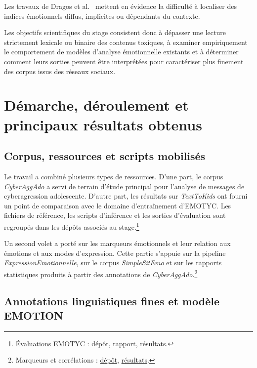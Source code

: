 Les travaux de Dragos et al.~\citep{dragos2022angry}  mettent en évidence la difficulté à localiser des indices émotionnels diffus, implicites ou dépendants du contexte.

Les objectifs scientifiques du stage consistent donc à dépasser une lecture strictement lexicale ou binaire des contenus toxiques, à examiner empiriquement le comportement de modèles d'analyse émotionnelle existants et à déterminer comment leurs sorties peuvent être interprétées pour caractériser plus finement des corpus issus des réseaux sociaux.


\section*{Démarche, déroulement et principaux résultats obtenus}

\subsection{Corpus, ressources et scripts mobilisés}

Le travail a combiné plusieurs types de ressources. D'une part, le corpus \textit{CyberAggAdo} a servi de terrain d'étude principal pour l'analyse de messages de cyberagression adolescente. D'autre part, les résultats sur \textit{TextToKids} ont fourni un point de comparaison avec le domaine d'entraînement d'EMOTYC. Les fichiers de référence, les scripts d'inférence et les sorties d'évaluation sont regroupés dans les dépôts associés au stage.\footnote{Évaluations EMOTYC : \href{https://github.com/GwenTsang/Eval-EMOTYC}{dépôt}, \href{https://github.com/GwenTsang/Eval-EMOTYC/blob/main/results/rapport_performances.md}{rapport}, \href{https://github.com/GwenTsang/Eval-EMOTYC/tree/main/results}{résultats}.}

Un second volet a porté sur les marqueurs émotionnels et leur relation aux émotions et aux modes d'expression. Cette partie s'appuie sur la pipeline \textit{ExpressionEmotionnelle}, sur le corpus \textit{SimpleSitEmo} et sur les rapports statistiques produits à partir des annotations de \textit{CyberAggAdo}.\footnote{Marqueurs et corrélations : \href{https://github.com/GwenTsang/ExpressionEmotionnelle}{dépôt}, \href{https://github.com/GwenTsang/ExpressionEmotionnelle/tree/main/results}{résultats}.}

\subsection{Annotations linguistiques fines et modèle EMOTION}

